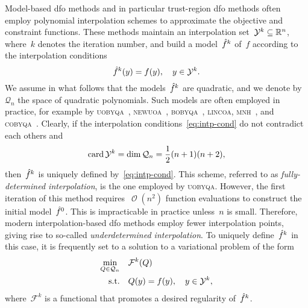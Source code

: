 \documentclass[draft]{article}
\numberwithin{equation}{section}
\theoremstyle{definition}
\DeclareMathOperator{\bigo}{\mathcal{O}}
\DeclareMathOperator{\card}{card}
\newcommand{\obj}{f}
\newcommand{\objm}[1][]{\hat{\obj}\ifblank{#1}{}{^{#1}}}
\newcommand{\qpoly}{\mathcal{Q}_n}
\newcommand{\R}{\mathbb{R}}
\newcommand{\solvername}[1]{\textsc{#1}\xspace}
\newcommand{\xpt}[1][]{\mathcal{Y}\ifblank{#1}{}{^{#1}}}
\begin{document}
Model-based \gls{dfo} methods and in particular trust-region \gls{dfo} methods often employ polynomial interpolation schemes to approximate the objective and constraint functions.
These methods maintain an interpolation set~$\xpt[k] \subseteq \R^n$, where~$k$ denotes the iteration number, and build a model~$\objm[k]$ of~$\obj$ according to the interpolation conditions
\begin{equation}
    \label{eq:intp-cond}
    \objm[k](y) = \obj(y), \quad y \in \xpt[k].
\end{equation}
We assume in what follows that the models~$\objm[k]$ are quadratic, and we denote by~$\qpoly$ the space of quadratic polynomials.
Such models are often employed in practice, for example by \solvername{uobyqa}~\cite{Powell_2002}, \solvername{newuoa}~\cite{Powell_2006}, \solvername{bobyqa}~\cite{Powell_2009}, \solvername{lincoa}, \solvername{mnh}~\cite{Wild_2008}, and \solvername{cobyqa}~\cite{Ragonneau_2022,Ragonneau_Zhang_2023}.
Clearly, if the interpolation conditions~\eqref{eq:intp-cond} do not contradict each others and
\begin{equation*}
    \card\xpt[k] = \dim\qpoly = \frac{1}{2} (n + 1) (n + 2),
\end{equation*}
then~$\objm[k]$ is uniquely defined by~\eqref{eq:intp-cond}.
This scheme, referred to as \emph{fully-determined interpolation}, is the one employed by \solvername{uobyqa}.
However, the first iteration of this method requires~$\bigo(n^2)$ function evaluations to construct the initial model~$\objm[0]$.
This is impracticable in practice unless~$n$ is small.
Therefore, modern interpolation-based \gls{dfo} methods employ fewer interpolation points, giving rise to so-called \emph{underdetermined interpolation}.
To uniquely define~$\objm[k]$ in this case, it is frequently set to a solution to a variational problem of the form
\begin{equation}
    \label{eq:intp-var}
    \begin{aligned}
        \min_{Q \in \qpoly} & \quad \mathcal{F}^k(Q)\\
        \text{s.t.}         & \quad Q(y) = \obj(y), \quad y \in \xpt[k],
    \end{aligned}
\end{equation}
where~$\mathcal{F}^k$ is a functional that promotes a desired regularity of~$\objm[k]$.
\end{document}
